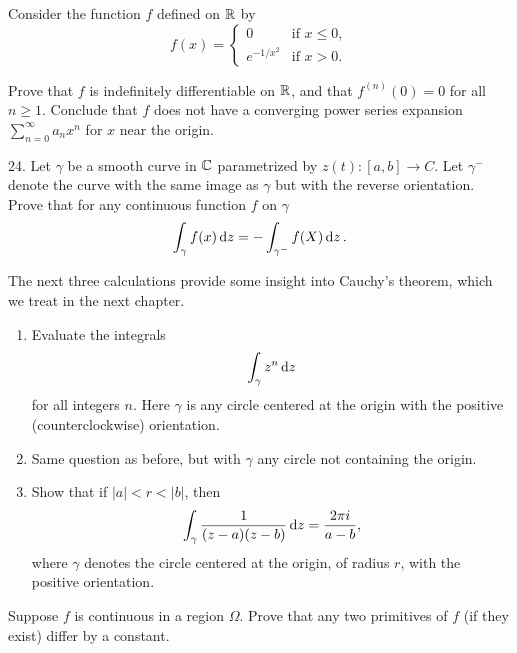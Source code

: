 \begin{exercise}
Consider the function $f$ defined on $\mathbb{R}$ by $$f(x)=\begin{cases} 0 & \text{if } x\leq 0, \\ e^{-1/x^2} & \text{if } x > 0. \end{cases}$$

Prove that $f$ is indefinitely differentiable on $\mathbb{R}$, and that $f^{(n)}
(0) = 0$ for all $n\geq 1$.
Conclude that $f$ does not have a converging power series expansion $\sum_{n=0}^\infty a_nx^n$ for $x$ near the origin.
\end{exercise}

\begin{exercise}

24. Let $\gamma$ be a smooth curve in $\mathbb{C}$ parametrized by $z(t):[a, b] \to C$. Let $\gamma^-$ denote the curve with the same image as $\gamma$ but with the reverse orientation. Prove that for any continuous function $f$ on $\gamma$ $$\int_\gamma f(x)\mathop{\mathrm{d}{z}} = -\int_{\gamma^-} f(X)\mathop{\mathrm{d}{z}}.$$
\end{exercise}

\begin{exercise}
The next three calculations provide some insight into Cauchy’s theorem, which we treat in the next chapter.

\begin{enumerate}[label=(\alph*)]
\item Evaluate the integrals $$\int_\gamma z^n\mathop{\mathrm{d}{z}}$$ for all integers $n$. Here $\gamma$ is any circle centered at the origin with the positive (counterclockwise) orientation.
\item Same question as before, but with $\gamma$ any circle not containing the origin.
\item Show that if $|a|<r<|b|$, then $$\int_\gamma \frac{1}{(z-a)(z-b)}\mathop{\mathrm{d}{z}} = \frac{2\pi i}{a-b},$$ where $\gamma$ denotes the circle centered at the origin, of radius $r$, with the positive orientation.
\end{enumerate}
\end{exercise}

\begin{exercise}
Suppose $f$ is continuous in a region $\Omega$. Prove that any two primitives of $f$ (if they exist) differ by a constant.
\end{exercise}
